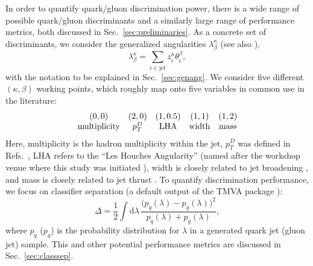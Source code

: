 \documentclass[11pt,letterpaper]{article}
\DeclareRobustCommand{\Sec}[1]{Sec.~\ref{#1}}
\DeclareRobustCommand{\Refs}[1]{Refs.~\cite{#1}}
\begin{document}
In order to quantify quark/gluon discrimination power, there is a wide range of possible quark/gluon discriminants and a similarly large range of performance metrics, both discussed in \Sec{sec:preliminaries}.  As a concrete set of discriminants, we consider the generalized angularities $\lambda_\beta^\kappa$ \cite{Larkoski:2014pca} (see also \cite{Berger:2003iw,Almeida:2008yp,Ellis:2010rwa,Larkoski:2014uqa}),
\begin{equation}
\label{eq:genang_intro}
\lambda^{\kappa}_{\beta} = \sum_{i \in \text{jet}} z_i^\kappa \theta_i^\beta,
\end{equation}
with the notation to be explained in \Sec{sec:genang}.  We consider five different $(\kappa, \beta)$ working points, which roughly map onto five variables in common use in the literature:
\begin{equation}
\arraycolsep=5pt
\begin{array}{ccccc}
(0,0) & (2,0) & (1,0.5) & (1,1) & (1,2) \\
\text{multiplicity} &  p_T^D &  \text{LHA} & \text{width} & \text{mass}
\end{array}
\end{equation}
Here, multiplicity is the hadron multiplicity within the
jet, $p_T^D$ was defined in
\Refs{Pandolfi:1480598,Chatrchyan:2012sn}, LHA refers to the
``Les Houches Angularity'' (named after the workshop venue where this study was initiated \cite{Badger:2016bpw}),
width is closely related to jet broadening
\cite{Catani:1992jc,Rakow:1981qn,Ellis:1986ig}, and mass is closely
related to jet thrust \cite{Farhi:1977sg}.  To quantify discrimination
performance, we focus on classifier separation (a default output of the 
TMVA package \cite{2007physics...3039H}):
\begin{equation}
\label{eq:deltadef_intro}
\Delta =  \frac{1}{2} \int \text{d} \lambda \, \frac{\bigl(p_q(\lambda) - p_g(\lambda)\bigr)^2}{p_q(\lambda) + p_g(\lambda)},
\end{equation}
where $p_q$ ($p_g$) is the probability distribution for $\lambda$ in a generated quark jet (gluon jet) sample. This and other potential performance
metrics are discussed in \Sec{sec:classsep}. 
\end{document}
